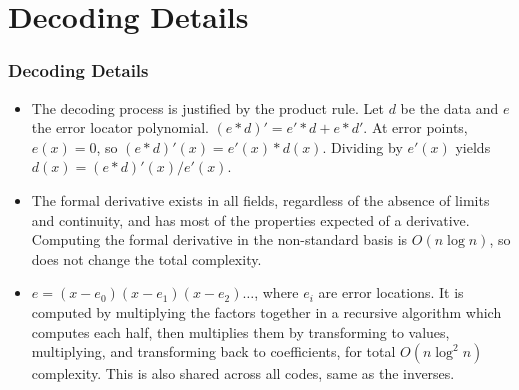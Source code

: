 \documentclass{beamer}
\begin{document}
\section{Decoding Details}
\begin{frame}
\frametitle{Decoding Details}
\begin{itemize}

\item
The decoding process is justified by the product rule. Let $d$ be the data and $e$ the error locator polynomial.
$(e * d)' = e' * d + e * d'$. At error points, $e(x) = 0$, so $(e * d)'(x) = e'(x) * d(x)$. Dividing by $e'(x)$ yields $d(x) = (e * d)'(x) / e'(x)$.

\item
The formal derivative exists in all fields, regardless of the absence of limits and continuity, and has most of the properties expected of a derivative.
Computing the formal derivative in the non-standard basis is $O(n \log n)$, so does not change the total complexity.

\item
$e = (x - e_0)(x - e_1)(x - e_2)\dots$, where $e_i$ are error locations.
It is computed by multiplying the factors together in a recursive algorithm which computes each half,
then multiplies them by transforming to values, multiplying, and transforming back to coefficients,
for total $O(n \log^2 n)$ complexity. This is also shared across all codes, same as the inverses.

\end{itemize}
\end{frame}
\end{document}
